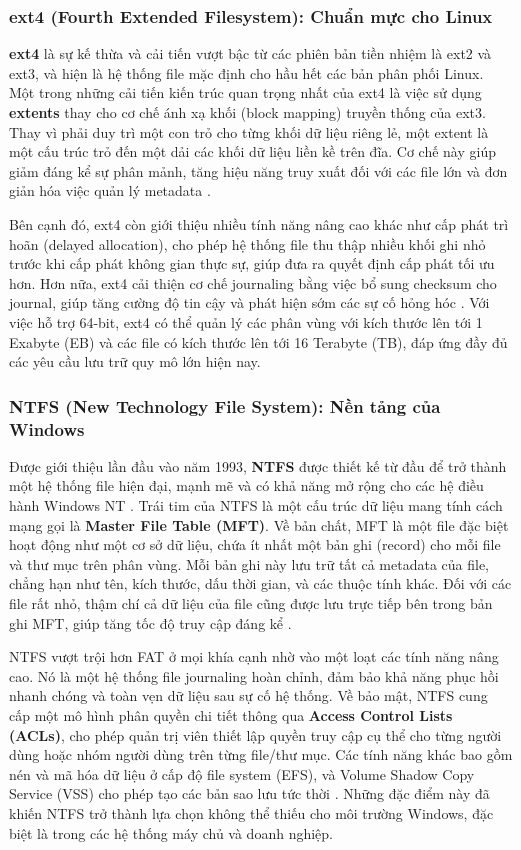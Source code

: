 \documentclass[12pt]{article}
\begin{document}
\subsubsection{ext4 (Fourth Extended Filesystem): Chuẩn mực cho Linux}
\textbf{ext4} là sự kế thừa và cải tiến vượt bậc từ các phiên bản tiền nhiệm là ext2 và ext3, và hiện là hệ thống file mặc định cho hầu hết các bản phân phối Linux. Một trong những cải tiến kiến trúc quan trọng nhất của ext4 là việc sử dụng \textbf{extents} thay cho cơ chế ánh xạ khối (block mapping) truyền thống của ext3. Thay vì phải duy trì một con trỏ cho từng khối dữ liệu riêng lẻ, một extent là một cấu trúc trỏ đến một dải các khối dữ liệu liền kề trên đĩa. Cơ chế này giúp giảm đáng kể sự phân mảnh, tăng hiệu năng truy xuất đối với các file lớn và đơn giản hóa việc quản lý metadata \parencite{Dhjaku2019}.

Bên cạnh đó, ext4 còn giới thiệu nhiều tính năng nâng cao khác như cấp phát trì hoãn (delayed allocation), cho phép hệ thống file thu thập nhiều khối ghi nhỏ trước khi cấp phát không gian thực sự, giúp đưa ra quyết định cấp phát tối ưu hơn. Hơn nữa, ext4 cải thiện cơ chế journaling bằng việc bổ sung checksum cho journal, giúp tăng cường độ tin cậy và phát hiện sớm các sự cố hỏng hóc \parencite{Dhjaku2019}. Với việc hỗ trợ 64-bit, ext4 có thể quản lý các phân vùng với kích thước lên tới 1 Exabyte (EB) và các file có kích thước lên tới 16 Terabyte (TB), đáp ứng đầy đủ các yêu cầu lưu trữ quy mô lớn hiện nay.

\subsubsection{NTFS (New Technology File System): Nền tảng của Windows}
Được giới thiệu lần đầu vào năm 1993, \textbf{NTFS} được thiết kế từ đầu để trở thành một hệ thống file hiện đại, mạnh mẽ và có khả năng mở rộng cho các hệ điều hành Windows NT \parencite{Cunningham2024}. Trái tim của NTFS là một cấu trúc dữ liệu mang tính cách mạng gọi là \textbf{Master File Table (MFT)}. Về bản chất, MFT là một file đặc biệt hoạt động như một cơ sở dữ liệu, chứa ít nhất một bản ghi (record) cho mỗi file và thư mục trên phân vùng. Mỗi bản ghi này lưu trữ tất cả metadata của file, chẳng hạn như tên, kích thước, dấu thời gian, và các thuộc tính khác. Đối với các file rất nhỏ, thậm chí cả dữ liệu của file cũng được lưu trực tiếp bên trong bản ghi MFT, giúp tăng tốc độ truy cập đáng kể \parencite{Dhjaku2019, Silberschatz2018}.

NTFS vượt trội hơn FAT ở mọi khía cạnh nhờ vào một loạt các tính năng nâng cao. Nó là một hệ thống file journaling hoàn chỉnh, đảm bảo khả năng phục hồi nhanh chóng và toàn vẹn dữ liệu sau sự cố hệ thống. Về bảo mật, NTFS cung cấp một mô hình phân quyền chi tiết thông qua \textbf{Access Control Lists (ACLs)}, cho phép quản trị viên thiết lập quyền truy cập cụ thể cho từng người dùng hoặc nhóm người dùng trên từng file/thư mục. Các tính năng khác bao gồm nén và mã hóa dữ liệu ở cấp độ file system (EFS), và Volume Shadow Copy Service (VSS) cho phép tạo các bản sao lưu tức thời \parencite{Tanenbaum2014}. Những đặc điểm này đã khiến NTFS trở thành lựa chọn không thể thiếu cho môi trường Windows, đặc biệt là trong các hệ thống máy chủ và doanh nghiệp.
\end{document}
